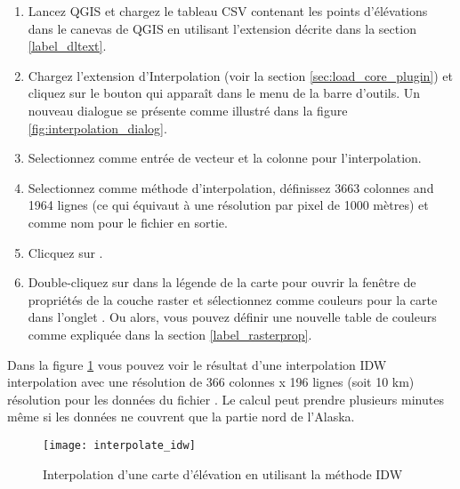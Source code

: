 \begin{enumerate}
  \item Lancez QGIS et chargez le tableau CSV  contenant les points d'\'el\'evations dans le canevas de QGIS en utilisant l'extension d\'ecrite dans la section \ref{label_dltext}. 
  \item Chargez l'extension d'Interpolation (voir la section \ref{sec:load_core_plugin}) et cliquez sur le bouton  qui appara\^it dans le menu de la barre d'outils. Un nouveau dialogue se pr\'esente comme illustr\'e dans la figure \ref{fig:interpolation_dialog}.
  \item Selectionnez  comme entr\'ee de vecteur et la colonne pour l'interpolation.
  \item Selectionnez  comme m\'ethode d'interpolation, d\'efinissez 3663 colonnes and 1964 lignes (ce qui \'equivaut \`a une r\'esolution par pixel de 1000 m\`etres) et  comme nom pour le fichier en sortie.
  \item Clicquez sur .
  \item Double-cliquez sur  dans la l\'egende de la carte pour ouvrir la fen\^etre de propri\'et\'es de la couche raster et s\'electionnez  comme couleurs pour la carte dans l'onglet . Ou alors, vous pouvez d\'efinir une nouvelle table de couleurs comme expliqu\'ee dans la section \ref{label_rasterprop}.
\end{enumerate}

%
%

Dans la figure \ref{fig:interpolation_idw} vous pouvez voir le r\'esultat d'une interpolation IDW interpolation avec une r\'esolution de 366 colonnes x 196 lignes (soit 10 km) r\'esolution pour les donn\'ees du fichier . Le calcul peut prendre plusieurs minutes m\^eme si les donn\'ees ne couvrent que la partie nord de l'Alaska.

\begin{figure}[ht]
   \begin{center}
   \caption{Interpolation d'une carte d'\'el\'evation en utilisant la m\'ethode IDW \nixcaption}\label{fig:interpolation_idw}\smallskip
   \texttt{[image: interpolate\_idw]}
\end{center}  
\end{figure}

\newpage



